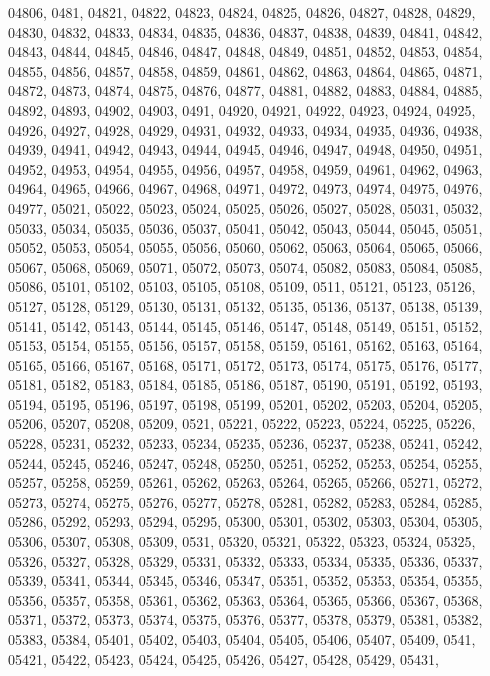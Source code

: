 {04806,
0481,
04821,
04822,
04823,
04824,
04825,
04826,
04827,
04828,
04829,
04830,
04832,
04833,
04834,
04835,
04836,
04837,
04838,
04839,
04841,
04842,
04843,
04844,
04845,
04846,
04847,
04848,
04849,
04851,
04852,
04853,
04854,
04855,
04856,
04857,
04858,
04859,
04861,
04862,
04863,
04864,
04865,
04871,
04872,
04873,
04874,
04875,
04876,
04877,
04881,
04882,
04883,
04884,
04885,
04892,
04893,
04902,
04903,
0491,
04920,
04921,
04922,
04923,
04924,
04925,
04926,
04927,
04928,
04929,
04931,
04932,
04933,
04934,
04935,
04936,
04938,
04939,
04941,
04942,
04943,
04944,
04945,
04946,
04947,
04948,
04950,
04951,
04952,
04953,
04954,
04955,
04956,
04957,
04958,
04959,
04961,
04962,
04963,
04964,
04965,
04966,
04967,
04968,
04971,
04972,
04973,
04974,
04975,
04976,
04977,
05021,
05022,
05023,
05024,
05025,
05026,
05027,
05028,
05031,
05032,
05033,
05034,
05035,
05036,
05037,
05041,
05042,
05043,
05044,
05045,
05051,
05052,
05053,
05054,
05055,
05056,
05060,
05062,
05063,
05064,
05065,
05066,
05067,
05068,
05069,
05071,
05072,
05073,
05074,
05082,
05083,
05084,
05085,
05086,
05101,
05102,
05103,
05105,
05108,
05109,
0511,
05121,
05123,
05126,
05127,
05128,
05129,
05130,
05131,
05132,
05135,
05136,
05137,
05138,
05139,
05141,
05142,
05143,
05144,
05145,
05146,
05147,
05148,
05149,
05151,
05152,
05153,
05154,
05155,
05156,
05157,
05158,
05159,
05161,
05162,
05163,
05164,
05165,
05166,
05167,
05168,
05171,
05172,
05173,
05174,
05175,
05176,
05177,
05181,
05182,
05183,
05184,
05185,
05186,
05187,
05190,
05191,
05192,
05193,
05194,
05195,
05196,
05197,
05198,
05199,
05201,
05202,
05203,
05204,
05205,
05206,
05207,
05208,
05209,
0521,
05221,
05222,
05223,
05224,
05225,
05226,
05228,
05231,
05232,
05233,
05234,
05235,
05236,
05237,
05238,
05241,
05242,
05244,
05245,
05246,
05247,
05248,
05250,
05251,
05252,
05253,
05254,
05255,
05257,
05258,
05259,
05261,
05262,
05263,
05264,
05265,
05266,
05271,
05272,
05273,
05274,
05275,
05276,
05277,
05278,
05281,
05282,
05283,
05284,
05285,
05286,
05292,
05293,
05294,
05295,
05300,
05301,
05302,
05303,
05304,
05305,
05306,
05307,
05308,
05309,
0531,
05320,
05321,
05322,
05323,
05324,
05325,
05326,
05327,
05328,
05329,
05331,
05332,
05333,
05334,
05335,
05336,
05337,
05339,
05341,
05344,
05345,
05346,
05347,
05351,
05352,
05353,
05354,
05355,
05356,
05357,
05358,
05361,
05362,
05363,
05364,
05365,
05366,
05367,
05368,
05371,
05372,
05373,
05374,
05375,
05376,
05377,
05378,
05379,
05381,
05382,
05383,
05384,
05401,
05402,
05403,
05404,
05405,
05406,
05407,
05409,
0541,
05421,
05422,
05423,
05424,
05425,
05426,
05427,
05428,
05429,
05431,
}
